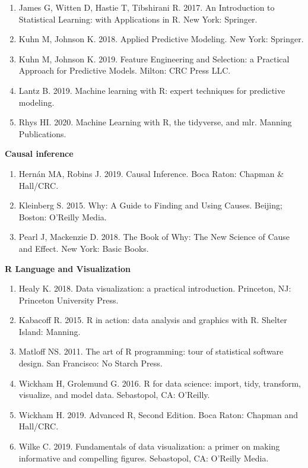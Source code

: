 \documentclass[
]{book}
\begin{document}
\begin{enumerate}
\def\labelenumi{\arabic{enumi}.}
\setcounter{enumi}{10}
\item
  James G, Witten D, Hastie T, Tibshirani R. 2017. An Introduction to Statistical Learning: with Applications in R. New York: Springer.
\item
  Kuhn M, Johnson K. 2018. Applied Predictive Modeling. New York: Springer.
\item
  Kuhn M, Johnson K. 2019. Feature Engineering and Selection: a Practical Approach for Predictive Models. Milton: CRC Press LLC.
\item
  Lantz B. 2019. Machine learning with R: expert techniques for predictive modeling.
\item
  Rhys HI. 2020. Machine Learning with R, the tidyverse, and mlr. Manning Publications.
\end{enumerate}

\textbf{Causal inference}

\begin{enumerate}
\def\labelenumi{\arabic{enumi}.}
\setcounter{enumi}{15}
\item
  Hernán MA, Robins J. 2019. Causal Inference. Boca Raton: Chapman \& Hall/CRC.
\item
  Kleinberg S. 2015. Why: A Guide to Finding and Using Causes. Beijing; Boston: O'Reilly Media.
\item
  Pearl J, Mackenzie D. 2018. The Book of Why: The New Science of Cause and Effect. New York: Basic Books.
\end{enumerate}

\textbf{R Language and Visualization}

\begin{enumerate}
\def\labelenumi{\arabic{enumi}.}
\setcounter{enumi}{18}
\item
  Healy K. 2018. Data visualization: a practical introduction. Princeton, NJ: Princeton University Press.
\item
  Kabacoff R. 2015. R in action: data analysis and graphics with R. Shelter Island: Manning.
\item
  Matloff NS. 2011. The art of R programming: tour of statistical software design. San Francisco: No Starch Press.
\item
  Wickham H, Grolemund G. 2016. R for data science: import, tidy, transform, visualize, and model data. Sebastopol, CA: O'Reilly.
\item
  Wickham H. 2019. Advanced R, Second Edition. Boca Raton: Chapman and Hall/CRC.
\item
  Wilke C. 2019. Fundamentals of data visualization: a primer on making informative and compelling figures. Sebastopol, CA: O'Reilly Media.
\end{enumerate}
\end{document}
